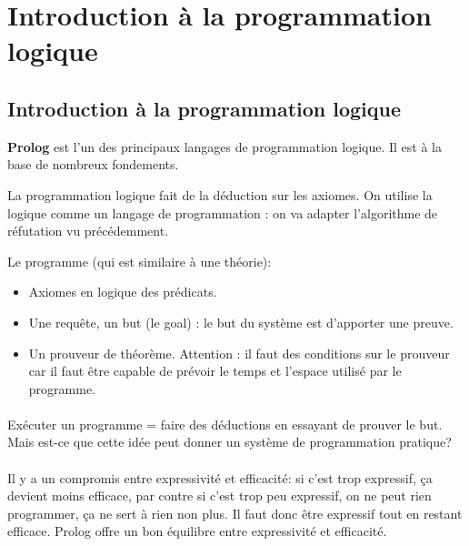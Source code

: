 \section{Introduction à la programmation logique}
\label{prolog}
\subsection{Introduction à la programmation logique}

\textbf{Prolog} est l'un des principaux langages de programmation logique. Il est à la base de nombreux fondements. 

La programmation logique fait de la déduction sur les axiomes.
On utilise la logique comme un langage de programmation : on va adapter l'algorithme de réfutation vu précédemment.

Le programme (qui est similaire à une théorie):
\begin{itemize}
	\item Axiomes en logique des prédicats.
	\item Une requête, un but (le goal) : le but du système est d'apporter une preuve.
	\item Un prouveur de théorème. Attention : il faut des conditions sur le prouveur car il faut être capable de prévoir le temps et l'espace utilisé par le programme.
\end{itemize}

\paragraph{}
Exécuter un programme = faire des déductions en essayant de prouver le but. Mais est-ce que cette idée peut donner un système de programmation pratique?

\paragraph{}
Il y a un compromis entre expressivité et efficacité: si c'est trop expressif, ça devient moins efficace, par contre si c'est trop peu expressif, on ne peut rien programmer, ça ne sert à rien non plus. Il faut donc être expressif tout en restant efficace. Prolog offre un bon équilibre entre expressivité et efficacité.


